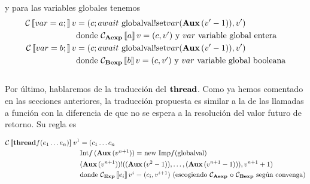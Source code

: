 y para las variables globales tenemos
\begin{align*} %
  \C\eval{var = a\;} v &= (c\; await \mbox{ globalval!set}var(\Aux\, (v' - 1)), v') \\
  & \mbox{donde $\C_\AExp\eval{a} v = (c, v')$ y $var$ variable global entera} \\
  \C\eval{var = b\;} v &= (c\; await \mbox{ globalval!set}var(\Aux\, (v' - 1)), v') \\
  & \mbox{donde $\C_\BExp\eval{b} v = (c, v')$ y $var$ variable global booleana}
\end{align*}\\

Por último, hablaremos de la traducción del $\textbf{thread}$. Como ya hemos comentado en las secciones anteriores, la traducción propuesta es similar a la de las llamadas a función con la diferencia de que no se espera a la resolución del valor futuro de retorno. Su regla es

\begin{align*}
\mathcal{C}\left\llbracket \textbf{thread} f(e_1 \dots e_n) \right\rrbracket v^{1} &= (c_1 \dots c_n\\
  &\mbox{Int$f\,(\textbf{Aux}\, (v^{n+1})) =$ new Imp$f($globalval$)$} \\
  &(\textbf{Aux}\, (v^{n+1}))!((\textbf{Aux}\, (v^{2} - 1)), \dots, (\textbf{Aux}\, (v^{n+1} - 1))), v^{n+1} + 1) \\
  &\mbox{donde $\mathcal{C}_{\textbf{Exp}}\left\llbracket e_i \right\rrbracket v^{i} = (c_i, v^{i+1})$ (escogiendo $\mathcal{C}_{\textbf{Aexp}}$ o $\mathcal{C}_{\textbf{Bexp}}$ según convenga)} \\
\end{align*}
